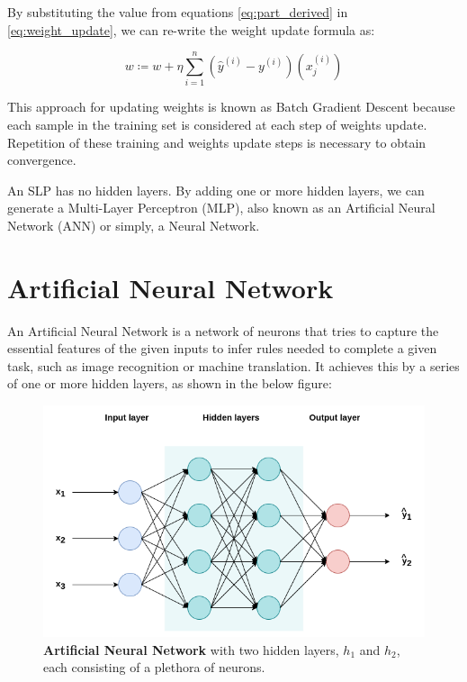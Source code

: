 By substituting the value from equations \ref{eq:part_derived} in \ref{eq:weight_update}, we can re-write the weight update formula as:

\begin{equation}
    w \coloneqq w + \eta \sum_{i=1}^{n}(\hat{y}^{(i)} - y^{(i)})(x_{j}^{(i)})
\end{equation}

This approach for updating weights is known as Batch Gradient Descent because each sample in the training set is considered at each step of weights update. Repetition of these training and weights update steps is necessary to obtain convergence.

An SLP has no hidden layers. By adding one or more hidden layers, we can generate a Multi-Layer Perceptron (MLP), also known as an Artificial Neural Network (ANN) or simply, a Neural Network.


\newpage
\section{Artificial Neural Network}\label{section:ann}

An Artificial Neural Network is a network of neurons that tries to capture the essential features of the given inputs to infer rules needed to complete a given task, such as image recognition or machine translation. It achieves this by a series of one or more hidden layers, as shown in the below figure:

\begin{figure}[h]
	\centering
	\includegraphics[width=0.7\linewidth]{images/background/neural_network.png}
	\caption[Artificial Neural Network]%
	{\textbf{Artificial Neural Network} with two hidden layers, $h_1$ and $h_2$, each consisting of a plethora of neurons.}
	\label{fig:neural_network}
\end{figure}

